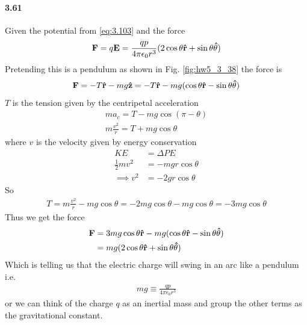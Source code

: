 \documentclass[../main.tex]{subfiles}
\begin{document}
\paragraph{3.61} Given the potential from \eqref{eq:3.103} and the force
\begin{align*}
    \vb F = q\vb E = \frac{qp}{4\pi\epsilon_0 r^3} (2\cos\theta \vu r + \sin\theta \vu\theta)
\end{align*}
Pretending this is a pendulum as shown in Fig. \ref{fig:hw5_3_38} the force is
\begin{align*}
    \vb F = - T \vu r - mg \vu z = - T \vu r - mg (\cos\theta \vu r - \sin\theta \vu\theta)
\end{align*}
$T$ is the tension given by the centripetal acceleration
\begin{gather*}
    m a_c = T - mg \cos(\pi - \theta) \\
    m\frac{v^2}{r} = T + mg \cos\theta
\end{gather*}
where $v$ is the velocity given by energy conservation
\begin{align*} 
    KE &= \Delta PE \\
    \frac{1}{2} m v^2 &= -mg r \cos\theta \\
    \implies v^2 &= -2g r \cos\theta
\end{align*}
So
\begin{align*}
    T = m\frac{v^2}{r} - mg \cos\theta = -2mg \cos\theta - mg \cos\theta  = -3mg \cos\theta
\end{align*}
Thus we get the force 
\begin{align*}
    \vb F &= 3mg \cos\theta \vu r - mg(\cos\theta \vu r - \sin\theta \vu\theta) \\
    &= mg (2\cos\theta \vu r + \sin\theta \vu\theta)
\end{align*}
Which is telling us that the electric charge will swing in an arc like a pendulum i.e.
\begin{align*}
    mg \equiv \frac{qp}{4\pi\epsilon_0 r^3}
\end{align*}
or we can think of the charge $q$ as an inertial mass and group the other terms as the gravitational constant.
\end{document}
